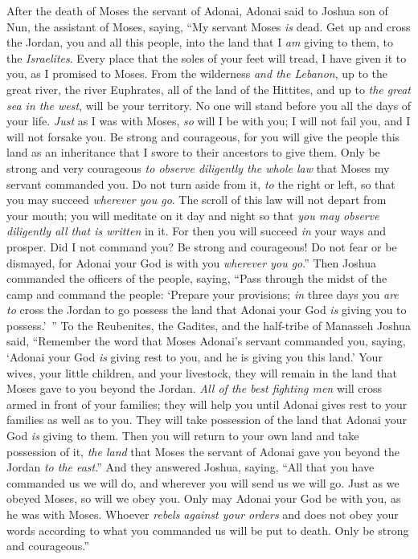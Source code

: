 
\begin{biblechapter} %
 After the death of Moses the servant of Adonai, Adonai said to Joshua son of Nun, the assistant of Moses, saying,
\verse “My servant Moses \textit{is} dead. Get up and cross the Jordan, you and all this people, into the land that I \textit{am} giving to them, to the \textit{Israelites}.
\verse Every place that the soles of your feet will tread, I have given it to you, as I promised to Moses.
\verse From the wilderness \textit{and the Lebanon}, up to the great river, the river Euphrates, all of the land of the Hittites, and up to \textit{the great sea in the west}, will be your territory.
\verse No one will stand before you all the days of your life. \textit{Just} as I was with Moses, \textit{so} will I be with you; I will not fail you, and I will not forsake you.
\verse Be strong and courageous, for you will give the people this land as an inheritance that I swore to their ancestors to give them.
\verse Only be strong and very courageous \textit{to observe diligently the whole law} that Moses my servant commanded you. Do not turn aside from it, \textit{to} the right or left, so that you may succeed \textit{wherever you go}.
\verse The scroll of this law will not depart from your mouth; you will meditate on it day and night so that \textit{you may observe diligently all that is written} in it. For then you will succeed \textit{in} your ways and prosper.
\verse Did I not command you? Be strong and courageous! Do not fear or be dismayed, for Adonai your God is with you \textit{wherever you go}.”
\verse Then Joshua commanded the officers of the people, saying,
\verse “Pass through the midst of the camp and command the people: ‘Prepare your provisions; \textit{in} three days you \textit{are to} cross the Jordan to go possess the land that Adonai your God \textit{is} giving you to possess.’ ”
\verse To the Reubenites, the Gadites, and the half-tribe of Manasseh Joshua said,
\verse “Remember the word that Moses Adonai’s servant commanded you, saying, ‘Adonai your God \textit{is} giving rest to you, and he is giving you this land.’
\verse Your wives, your little children, and your livestock, they will remain in the land that Moses gave to you beyond the Jordan. \textit{All of the best fighting men} will cross armed in front of your families; they will help you
\verse until Adonai gives rest to your families as well as to you. They will take possession of the land that Adonai your God \textit{is} giving to them. Then you will return to your own land and take possession of it, \textit{the land} that Moses the servant of Adonai gave you beyond the Jordan \textit{to the east}.”
\verse And they answered Joshua, saying, “All that you have commanded us we will do, and wherever you will send us we will go.
\verse Just as we obeyed Moses, so will we obey you. Only may Adonai your God be with you, as he was with Moses.
\verse Whoever \textit{rebels against your orders} and does not obey your words according to what you commanded us will be put to death. Only be strong and courageous.”
\end{biblechapter}

